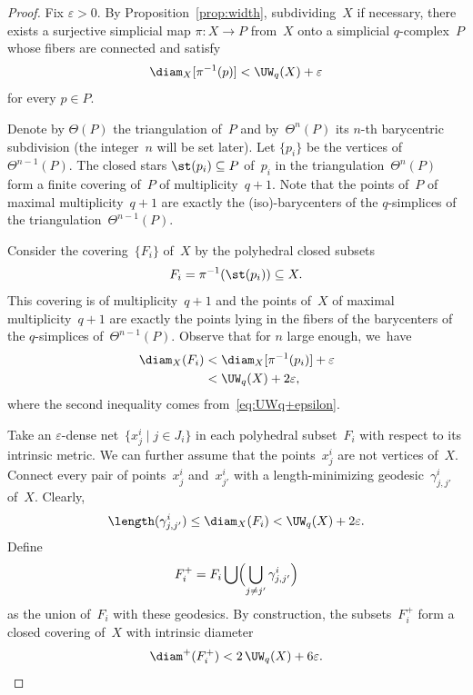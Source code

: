 \begin{proof}
Fix $\varepsilon >0$.
By Proposition~\ref{prop:width}, subdividing~$X$ if necessary, there exists a surjective simplicial map $\pi:X \to P$ from~$X$ onto a simplicial $q$-complex~$P$ whose fibers are connected and satisfy
\begin{equation} \label{eq:UWq+epsilon}
\diam_X[\pi^{-1}(p)] < \UW_q(X) + \varepsilon
\end{equation}
for every $p \in P$.

Denote by $\Theta(P)$ the triangulation of~$P$ and by~$\Theta^n(P)$ its $n$-th barycentric subdivision (the integer~$n$ will be set later).
Let $\{p_i\}$ be the vertices of~$\Theta^{n-1}(P)$.
The closed stars $\st(p_i) \subseteq P$ of~$p_i$ in the triangulation~$\Theta^n(P)$ form a finite covering of~$P$ of multiplicity~$q+1$.
Note that the points of~$P$ of maximal multiplicity~$q+1$ are exactly the (iso)-barycenters of the $q$-simplices of the triangulation~$\Theta^{n-1}(P)$.

Consider the covering~$\{F_i\}$ of~$X$ by the polyhedral closed subsets
\[
F_i= \pi^{-1}(\st(p_i)) \subseteq X.
\]
This covering is of multiplicity~$q+1$ and the points of~$X$ of maximal multiplicity~$q+1$ are exactly the points lying in the fibers of the barycenters of the $q$-simplices of~$\Theta^{n-1}(P)$.
Observe that for $n$ large enough, we~have
\begin{align*}
\diam_X(F_i) & < \diam_X[\pi^{-1}(p_i)] + \varepsilon \\ & < \UW_q(X) + 2\varepsilon,
\end{align*}
where the second inequality comes from~\eqref{eq:UWq+epsilon}.

Take an $\varepsilon$-dense net~$\{x^i_j \mid j \in J_i\}$ in each polyhedral subset~$F_i$ with respect to its intrinsic metric.
We can further assume that the points~$x^i_j$ are not vertices of~$X$.
Connect every pair of points~$x^i_j$ and~$x^i_{j'}$ with a length-minimizing geodesic~$\gamma^i_{j,j'}$ of~$X$.
Clearly,
\[
\length(\gamma^i_{j,j'}) \leq \diam_X(F_i) < \UW_q(X) + 2 \varepsilon.
\]
Define
\[
F_i^+ = F_i \bigcup \Bigl(\bigcup_{j \neq j'} \gamma^i_{j,j'} \Bigr)
\]
as the union of~$F_i$ with these geodesics.
By construction, the subsets~$F_i^+$ form a closed covering of~$X$ with intrinsic diameter
\begin{equation} \label{eq:Ui+}
\diam^+(F_i^+) < 2 \, \UW_q(X)+6 \varepsilon.
\end{equation}


\end{proof}
